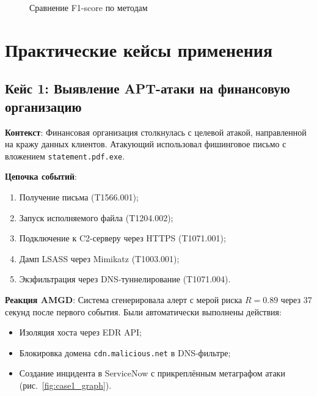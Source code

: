 \begin{figure}[h]
    \centering
    \caption{Сравнение F1-score по методам}
    \label{fig:f1_comparison}
\end{figure}

\section{Практические кейсы применения}\label{sec:ch4/sect5}

\subsection{Кейс 1: Выявление APT-атаки на финансовую организацию}

\textbf{Контекст}:  
Финансовая организация столкнулась с целевой атакой, направленной на кражу данных клиентов. Атакующий использовал фишинговое письмо с вложением \texttt{statement.pdf.exe}.

\textbf{Цепочка событий}:
\begin{enumerate}
    \item Получение письма (T1566.001);
    \item Запуск исполняемого файла (T1204.002);
    \item Подключение к C2-серверу через HTTPS (T1071.001);
    \item Дамп LSASS через Mimikatz (T1003.001);
    \item Экзфильтрация через DNS-туннелирование (T1071.004).
\end{enumerate}

\textbf{Реакция AMGD}:  
Система сгенерировала алерт с мерой риска $R = 0.89$ через 37 секунд после первого события. Были автоматически выполнены действия:
\begin{itemize}
    \item Изоляция хоста через EDR API;
    \item Блокировка домена \texttt{cdn.malicious.net} в DNS-фильтре;
    \item Создание инцидента в ServiceNow с прикреплённым метаграфом атаки (рис.~\ref{fig:case1_graph}).
\end{itemize}

